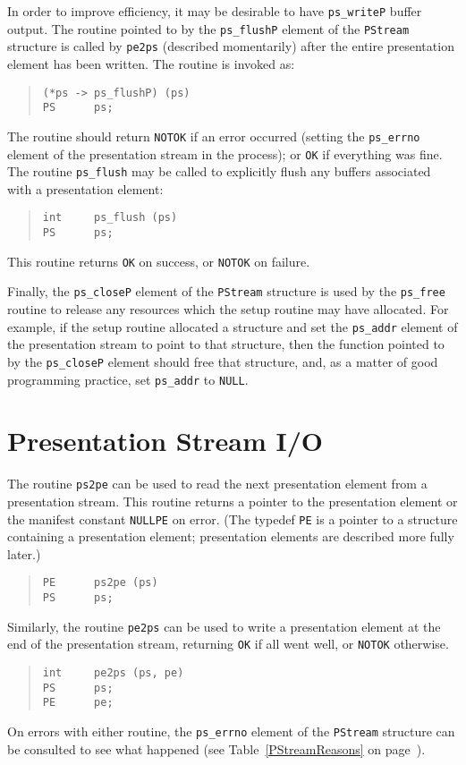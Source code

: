 In order to improve efficiency,
it may be desirable to have \verb"ps_writeP" buffer output.
The routine pointed to by the \verb"ps_flushP" element of the \verb"PStream"
structure is called by \verb"pe2ps" (described momentarily)
after the entire presentation element has been written.
The routine is invoked as:
\begin{quote}\small\begin{verbatim}
(*ps -> ps_flushP) (ps)
PS      ps;
\end{verbatim}\end{quote}
The routine should return \verb"NOTOK" if an error occurred
(setting the \verb"ps_errno" element of the presentation stream in the
process);
or \verb"OK" if everything was fine.
The routine \verb"ps_flush" may be called to explicitly flush any buffers
associated with a presentation element:
\begin{quote}\small\begin{verbatim}
int     ps_flush (ps)
PS      ps;
\end{verbatim}\end{quote}
This routine returns \verb"OK" on success,
or \verb"NOTOK" on failure.

Finally,
the \verb"ps_closeP" element of the \verb"PStream" structure is used by the
\verb"ps_free" routine to release any resources which the setup routine may
have allocated.
For example,
if the setup routine allocated a structure and set the \verb"ps_addr"
element of the presentation stream to point to that structure,
then the function pointed to by the \verb"ps_closeP" element should free that
structure,
and, as a matter of good programming practice, set \verb"ps_addr" to
\verb"NULL".

\section	{Presentation Stream I/O}
The routine \verb"ps2pe" can be used to read the next presentation element
from a presentation stream.
This routine returns a pointer to the presentation element or the manifest
constant \verb"NULLPE" on error.
(The typedef \verb"PE" is a pointer to a structure containing a presentation
element; presentation elements are described more fully later.)
\begin{quote}\small\begin{verbatim}
PE      ps2pe (ps)
PS      ps;
\end{verbatim}\end{quote}
Similarly,
the routine \verb"pe2ps" can be used to write a presentation element at the end
of the presentation stream,
returning \verb"OK" if all went well, or \verb"NOTOK" otherwise.
\begin{quote}\small\begin{verbatim}
int     pe2ps (ps, pe)
PS      ps;
PE      pe;
\end{verbatim}\end{quote}
On errors with either routine,
the \verb"ps_errno" element of the \verb"PStream" structure can be consulted
to see what happened
(see Table~\ref{PStreamReasons} on page~\pageref{PStreamReasons}).

